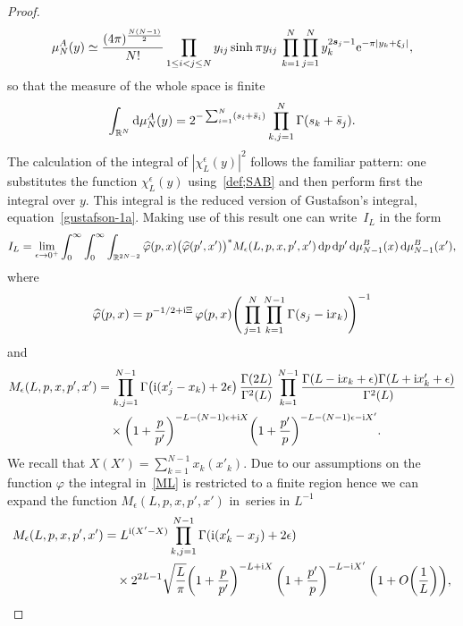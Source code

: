 \documentclass[pdftex]{sigma}%
\numberwithin{equation}{section}
\begin{document}
\begin{proof}
\begin{gather*}
\mu^A_N(y) \simeq \frac{(4\pi)^{\frac{N(N-1)}2}}{ N!}
\prod_{1\leq i<j\leq N} y_{ij}\sinh\pi y_{ij}\, \prod_{k=1}^N\prod_{j=1}^N y_k^{2\boldsymbol s_j-1}{\rm e}^{-\pi|y_k+\xi_j|},
\end{gather*}
so that the measure of the whole space is finite
\begin{gather*}
\int_{\mathbb R^N}{\rm d}\mu_N^A(y)=2^{-\sum_{i=1}^N (s_i+\bar s_i)}\prod_{k,j=1}^N\Gamma(s_k+\bar s_j).
\end{gather*}
The calculation of the integral of $|\chi_L^\epsilon(y)|^2$ follows the familiar pattern: one substitutes the function $\chi^\epsilon_L(y)$
using~\eqref{def;SAB} and then perform first the integral over $y$. This integral is the reduced version of Gustafson's integral,
equation~\eqref{gustafson-1a}. Making use of this result one can write~$I_L$ in the form
\begin{gather*}
I_L=\lim_{\epsilon\to 0^+}\int_0^\infty \int_0^\infty \int_{\mathbb R^{2N-2}}\widehat \varphi(p,x)\big(\widehat\varphi(p',x')\big)^*
 M_\epsilon(L,p,x,p',x') \,{\rm d}p \,{\rm d}p' \,{\rm d}\mu_{N-1}^B(x)\,{\rm d}\mu_{N-1}^B(x'),
\end{gather*}
where
\begin{gather*}
\widehat\varphi(p,x)=p^{-1/2+{\rm i}\Xi}\,{\varphi(p,x)}\Bigg(\prod_{j=1}^N\prod_{k=1}^{N-1} \Gamma(s_j-{\rm i}x_k)\Bigg)^{-1}
\end{gather*}
and
\begin{align}
M_\epsilon(L,p,x,p',x')&
=\prod_{k,j=1}^{N-1}\Gamma\big({\rm i}(x'_j-x_k)+2\epsilon\big)\,\frac{\Gamma(2L)}{\Gamma^2(L)}\,
\prod_{k=1}^{N-1} \frac{\Gamma(L-{\rm i}x_k+\epsilon) \Gamma(L+{\rm i}x'_k+\epsilon)}{\Gamma^2(L)}\notag
\\
&\quad\times \bigg(1+\frac p{p'}\bigg)^{-L-(N-1)\epsilon+{\rm i}X}
\bigg(1+\frac{p'}p\bigg)^{-L-(N-1)\epsilon-{\rm i}X'}.\label{ML}
\end{align}
We recall that $X(X')=\sum_{k=1}^{N-1}x_k (x'_k)$. Due to our assumptions on the function $\varphi$ the integral in~\eqref{ML} is
restricted to a finite region hence we can expand the function $M_\epsilon(L,p,x,p',x')$ in~series in $L^{-1}$
\begin{align}\label{MLL}
M_\epsilon(L,p,x,p',x') & =L^{{\rm i}(X'-X)}\prod_{k,j=1}^{N-1}\Gamma({\rm i}(x'_k-x_j)+2\epsilon)
\notag\\
&\quad\times
 2^{2L-1}
\sqrt{\frac{L}\pi}\bigg(1+\frac p{p'}\bigg)^{-L+{\rm i}X}
\,\bigg(1+\frac{p'}p\bigg)^{-L-{\rm i}X'} \,\bigg(1+O\bigg(\frac1L\bigg)\bigg),

\end{align}
\end{proof}
\end{document}
